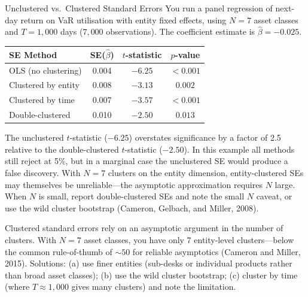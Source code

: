 \begin{workedexample}{Unclustered vs.\ Clustered Standard Errors}
You run a panel regression of next-day return on VaR utilisation with entity fixed effects, using $N = 7$ asset classes and $T = 1{,}000$ days ($7{,}000$ observations).
The coefficient estimate is $\hat{\beta} = -0.025$.

\medskip
\begin{center}
\begin{tabular}{lccc}
  \toprule
  \textbf{SE Method} & \textbf{SE($\hat{\beta}$)} & \textbf{$t$-statistic} & \textbf{$p$-value} \\
  \midrule
  OLS (no clustering)          & 0.004 & $-6.25$ & $< 0.001$ \\
  Clustered by entity          & 0.008 & $-3.13$ & $0.002$ \\
  Clustered by time            & 0.007 & $-3.57$ & $< 0.001$ \\
  Double-clustered             & 0.010 & $-2.50$ & $0.013$ \\
  \bottomrule
\end{tabular}
\end{center}
\medskip

The unclustered $t$-statistic ($-6.25$) overstates significance by a factor of 2.5 relative to the double-clustered $t$-statistic ($-2.50$).
In this example all methods still reject at 5\%, but in a marginal case the unclustered SE would produce a false discovery.
With $N = 7$ clusters on the entity dimension, entity-clustered SEs may themselves be unreliable---the asymptotic approximation requires $N$ large.
When $N$ is small, report double-clustered SEs and note the small $N$ caveat, or use the wild cluster bootstrap (Cameron, Gelbach, and Miller, 2008).
\end{workedexample}

\begin{prereq}
Clustered standard errors rely on an asymptotic argument in the number of clusters.
With $N = 7$ asset classes, you have only 7 entity-level clusters---below the common rule-of-thumb of ${\sim}50$ for reliable asymptotics (Cameron and Miller, 2015).
Solutions: (a) use finer entities (sub-desks or individual products rather than broad asset classes); (b) use the wild cluster bootstrap; (c) cluster by time (where $T \approx 1{,}000$ gives many clusters) and note the limitation.
\end{prereq}

